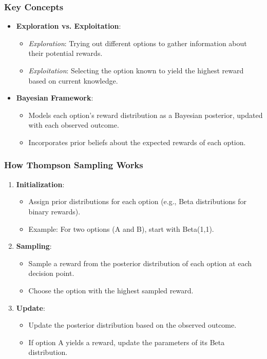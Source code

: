 \documentclass[aspectratio=169]{beamer}
\begin{document}
\begin{frame}[fragile]
    \frametitle{Key Concepts}
    \begin{itemize}
        \item \textbf{Exploration vs. Exploitation}:
        \begin{itemize}
            \item \textit{Exploration}: Trying out different options to gather information about their potential rewards.
            \item \textit{Exploitation}: Selecting the option known to yield the highest reward based on current knowledge.
        \end{itemize}
        
        \item \textbf{Bayesian Framework}:
        \begin{itemize}
            \item Models each option's reward distribution as a Bayesian posterior, updated with each observed outcome.
            \item Incorporates prior beliefs about the expected rewards of each option.
        \end{itemize}
    \end{itemize}
\end{frame}

\begin{frame}[fragile]
    \frametitle{How Thompson Sampling Works}
    \begin{enumerate}
        \item \textbf{Initialization}:
        \begin{itemize}
            \item Assign prior distributions for each option (e.g., Beta distributions for binary rewards).
            \item Example: For two options (A and B), start with Beta(1,1).
        \end{itemize}

        \item \textbf{Sampling}:
        \begin{itemize}
            \item Sample a reward from the posterior distribution of each option at each decision point.
            \item Choose the option with the highest sampled reward.
        \end{itemize}

        \item \textbf{Update}:
        \begin{itemize}
            \item Update the posterior distribution based on the observed outcome.
            \item If option A yields a reward, update the parameters of its Beta distribution.
        \end{itemize}
    \end{enumerate}
\end{frame}
\end{document}

